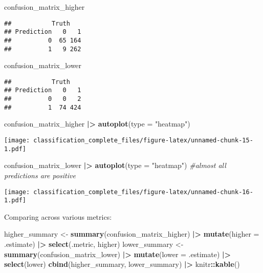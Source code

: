 \documentclass[
]{article}
\newenvironment{Shaded}{\begin{snugshade}}{\end{snugshade}}
\newcommand{\AttributeTok}[1]{\textcolor[rgb]{0.13,0.29,0.53}{#1}}
\newcommand{\CommentTok}[1]{\textcolor[rgb]{0.56,0.35,0.01}{\textit{#1}}}
\newcommand{\FunctionTok}[1]{\textcolor[rgb]{0.13,0.29,0.53}{\textbf{#1}}}
\newcommand{\NormalTok}[1]{#1}
\newcommand{\OtherTok}[1]{\textcolor[rgb]{0.56,0.35,0.01}{#1}}
\newcommand{\SpecialCharTok}[1]{\textcolor[rgb]{0.81,0.36,0.00}{\textbf{#1}}}
\newcommand{\StringTok}[1]{\textcolor[rgb]{0.31,0.60,0.02}{#1}}
\begin{document}
\begin{Shaded}
\begin{Highlighting}[]
\NormalTok{confusion\_matrix\_higher}
\end{Highlighting}
\end{Shaded}

\begin{verbatim}
##           Truth
## Prediction   0   1
##          0  65 164
##          1   9 262
\end{verbatim}

\begin{Shaded}
\begin{Highlighting}[]
\NormalTok{confusion\_matrix\_lower}
\end{Highlighting}
\end{Shaded}

\begin{verbatim}
##           Truth
## Prediction   0   1
##          0   0   2
##          1  74 424
\end{verbatim}

\begin{Shaded}
\begin{Highlighting}[]
\NormalTok{confusion\_matrix\_higher }\SpecialCharTok{|\textgreater{}} \FunctionTok{autoplot}\NormalTok{(}\AttributeTok{type =} \StringTok{"heatmap"}\NormalTok{)}
\end{Highlighting}
\end{Shaded}

\texttt{[image: classification\_complete\_files/figure-latex/unnamed-chunk-15-1.pdf]}

\begin{Shaded}
\begin{Highlighting}[]
\NormalTok{confusion\_matrix\_lower }\SpecialCharTok{|\textgreater{}} \FunctionTok{autoplot}\NormalTok{(}\AttributeTok{type =} \StringTok{"heatmap"}\NormalTok{) }\CommentTok{\#almost all predictions are positive}
\end{Highlighting}
\end{Shaded}

\texttt{[image: classification\_complete\_files/figure-latex/unnamed-chunk-16-1.pdf]}

Comparing across various metrics:

\begin{Shaded}
\begin{Highlighting}[]
\NormalTok{higher\_summary }\OtherTok{\textless{}{-}} \FunctionTok{summary}\NormalTok{(confusion\_matrix\_higher) }\SpecialCharTok{|\textgreater{}}
  \FunctionTok{mutate}\NormalTok{(}\AttributeTok{higher =}\NormalTok{ .estimate) }\SpecialCharTok{|\textgreater{}}
  \FunctionTok{select}\NormalTok{(.metric, higher)}
\NormalTok{lower\_summary }\OtherTok{\textless{}{-}} \FunctionTok{summary}\NormalTok{(confusion\_matrix\_lower) }\SpecialCharTok{|\textgreater{}}
  \FunctionTok{mutate}\NormalTok{(}\AttributeTok{lower =}\NormalTok{ .estimate) }\SpecialCharTok{|\textgreater{}}
  \FunctionTok{select}\NormalTok{(lower)}
\FunctionTok{cbind}\NormalTok{(higher\_summary, lower\_summary) }\SpecialCharTok{|\textgreater{}}
\NormalTok{  knitr}\SpecialCharTok{::}\FunctionTok{kable}\NormalTok{()}
\end{Highlighting}
\end{Shaded}
\end{document}
